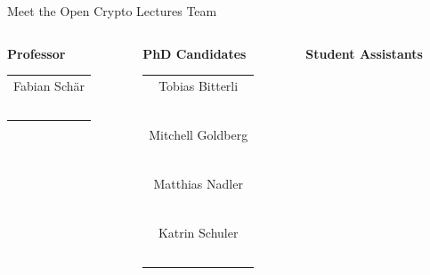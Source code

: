 \documentclass[]{beamer}
\begin{document}
\begin{frame}{Meet the Open Crypto Lectures Team}
	\begin{columns}[T]
		\begin{column}{0.31\textwidth}
			\center \textbf{Professor}
			\begin{table}\small
				\begin{tabular}{c}
					Fabian Schär\\
					\href{https://linkedin.com/in/fabian-schaer/}{\faLinkedinSquare}\ \href{https://twitter.com/chainomics}{\faTwitterSquare}\\
				\end{tabular}
			\end{table}
		\end{column}
		\begin{column}{0.31\textwidth}
			\center \textbf{PhD Candidates}
			\begin{table}\small
				\begin{tabular}{c}
					Tobias Bitterli\\
					\href{https://linkedin.com/in/tobiasbitterli/}{\faLinkedinSquare}\ \href{https://twitter.com/tobias_bitterli}{\faTwitterSquare}\\
					\vspace{0.5em}\\
					Mitchell Goldberg\\
					\href{https://linkedin.com/in/mitchell-goldberg/}{\faLinkedinSquare}\ \href{https://twitter.com/golmit_crypto}{\faTwitterSquare}\\
					\vspace{0.5em}\\
					Matthias Nadler\\
					\href{https://linkedin.com/in/mat-nadler/}{\faLinkedinSquare}\ \href{https://twitter.com/mat_nadler}{\faTwitterSquare}\\
					\vspace{0.5em}\\
					Katrin Schuler\\
					\href{https://linkedin.com/in/kmschuler/}{\faLinkedinSquare}\ \href{https://twitter.com/Katatcrypt}{\faTwitterSquare}\\
				\end{tabular}
			\end{table}
		\end{column}
		\begin{column}{0.31\textwidth}
			\center \textbf{Student Assistants}
			\begin{table}\small
				\begin{tabular}{c}

\end{tabular}
\end{table}
\end{column}
\end{columns}
\end{frame}
\end{document}
